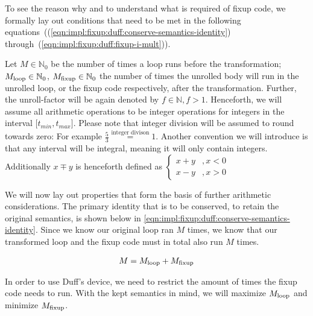 To see the reason why and to understand what is required of fixup code, we formally lay out conditions that need to be met in the following equations~((\ref{eqn:impl:fixup:duff:conserve-semantics-identity}) through~(\ref{eqn:impl:fixup:duff:fixup-i-mult})).

Let $M \in \mathbb{N}_0$ be the number of times a loop runs before the transformation; $M_{\text{loop}} \in \mathbb{N}_0$, $M_{\text{fixup}} \in \mathbb{N}_0$ the number of times the unrolled body will run in the unrolled loop, or the fixup code respectively, after the transformation.
Further, the unroll-factor will be again denoted by $f \in \mathbb{N}, f > 1$.
Henceforth, we will assume all arithmetic operations to be integer operations for integers in the interval $\lbrack t_{min}, t_{max} \rbrack$.
Please note that integer division will be assumed to round towards zero: For example $\frac{5}{3} \overset{\text{integer divison}}{=} 1$.
Another convention we will introduce is that any interval will be integral, meaning it will only contain integers.
Additionally $x \mp y$ is henceforth defined as
$\begin{cases}
     x + y &, x < 0\\
     x - y &, x > 0
\end{cases}$

We will now lay out properties that form the basis of further arithmetic considerations.
The primary identity that is to be conserved, to retain the original semantics, is shown below in \cref{eqn:impl:fixup:duff:conserve-semantics-identity}.
Since we know our original loop ran $M$ times, we know that our transformed loop and the fixup code must in total also run $M$ times.

\begin{equation}\label{eqn:impl:fixup:duff:conserve-semantics-identity}
\begin{aligned}
    M = M_{\text{loop}} + M_{\text{fixup}}
\end{aligned}
\end{equation}

In order to use Duff's device, we need to restrict the amount of times the fixup code needs to run.
With the kept semantics in mind, we will maximize $M_{\text{loop}}$ and minimize $M_{\text{fixup}}$.

